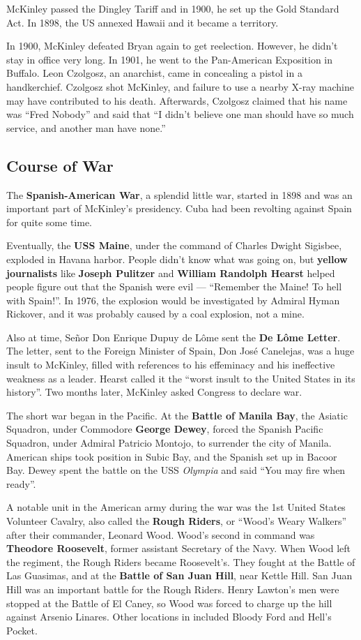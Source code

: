 McKinley passed the Dingley Tariff and in 1900, he set up the Gold Standard Act.
In 1898, the US annexed Hawaii and it became a territory.

In 1900, McKinley defeated Bryan again to get reelection.
However, he didn't stay in office very long.
In 1901, he went to the Pan-American Exposition in Buffalo.
Leon Czolgosz, an anarchist, came in concealing a pistol in a handkerchief.
Czolgosz shot McKinley, and failure to use a nearby X-ray machine may have contributed to his death.
Afterwards, Czolgosz claimed that his name was ``Fred Nobody''
and said that ``I didn't believe one man should have so much service, and another man have none.''

\subsection*{Course of War}

The \textbf{Spanish-American War}, a splendid little war,
started in 1898 and was an important part of McKinley's presidency.
Cuba had been revolting against Spain for quite some time.

Eventually, the \textbf{USS Maine}, under the command of Charles Dwight Sigisbee, exploded in Havana harbor.
People didn't know what was going on,
but \textbf{yellow journalists} like \textbf{Joseph Pulitzer} and \textbf{William Randolph Hearst}
helped people figure out that the Spanish were evil ---
``Remember the Maine! To hell with Spain!''.
In 1976, the explosion would be investigated by Admiral Hyman Rickover,
and it was probably caused by a coal explosion, not a mine.

Also at time, Se\~nor Don Enrique Dupuy de L\^ome sent the \textbf{De L\^ome Letter}.
The letter, sent to the Foreign Minister of Spain, Don Jos\'e Canelejas, was a huge insult to McKinley,
filled with references to his effeminacy and his ineffective weakness as a leader.
Hearst called it the ``worst insult to the United States in its history''.
Two months later, McKinley asked Congress to declare war.

The short war began in the Pacific.
At the \textbf{Battle of Manila Bay},
the Asiatic Squadron, under Commodore \textbf{George Dewey},
forced the Spanish Pacific Squadron, under Admiral Patricio Montojo,
to surrender the city of Manila.
American ships took position in Subic Bay, and the Spanish set up in Bacoor Bay.
Dewey spent the battle on the USS \textit{Olympia} and said ``You may fire when ready''.

A notable unit in the American army during the war was the 1st United States Volunteer Cavalry,
also called the \textbf{Rough Riders}, or ``Wood's Weary Walkers'' after their commander, Leonard Wood.
Wood's second in command was \textbf{Theodore Roosevelt}, former assistant Secretary of the Navy.
When Wood left the regiment, the Rough Riders became Roosevelt's.
They fought at the Battle of Las Guasimas, and at the \textbf{Battle of San Juan Hill}, near Kettle Hill.
San Juan Hill was an important battle for the Rough Riders.
Henry Lawton's men were stopped at the Battle of El Caney,
so Wood was forced to charge up the hill against Arsenio Linares.
Other locations in included Bloody Ford and Hell's Pocket.

